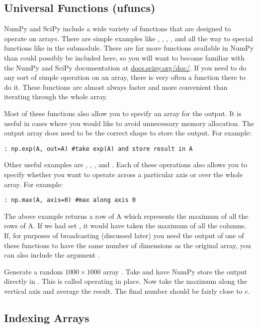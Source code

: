 \subsection*{Universal Functions (ufuncs)}
NumPy and SciPy include a wide variety of functions that are designed to operate on arrays.
There are simple examples like , , , , and  all the way to special functions like  in the  submodule.
There are far more functions available in NumPy than could possibly be included here, so you will want to become familiar with the NumPy and SciPy documentation at \url{docs.scipy.org/doc/}.
If you need to do any sort of simple operation on an array, there is very often a function there to do it.
These functions are almost always faster and more convenient than iterating through the whole array.

Most of these functions also allow you to specify an array for the output.
It is useful in cases where you would like to avoid unnecessary memory allocation.
The output array does need to be the correct shape to store the output.
For example:
\begin{lstlisting}
: np.exp(A, out=A) #take exp(A) and store result in A
\end{lstlisting}

Other useful examples are , , , and .
Each of these operations also allows you to specify whether you want to operate across a particular axis or over the whole array.
For example:
\begin{lstlisting}
: np.max(A, axis=0) #max along axis 0
\end{lstlisting}
The above example returns a row of A which represents the maximum of all the rows of A.
If we had set , it would have taken the maximum of all the columns.
If, for purposes of broadcasting (discussed later) you need the output of one of these functions to have the same number of dimensions as the original array, you can also include the argument .

\begin{problem}
Generate a random $1000 \times 1000$ array .
Take  and have NumPy store the output directly in .
This is called operating in place.
Now take the maximum along the vertical axis and average the result.
The final number should be fairly close to $e$.
\end{problem}

\subsection*{Indexing Arrays}
